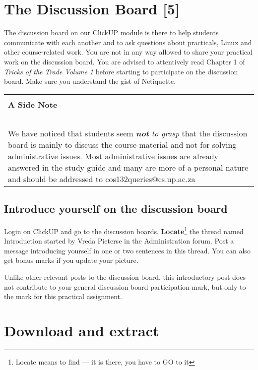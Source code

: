 \documentclass [a4paper,leqno, 12pt] {article}
\begin{document}
\section{The Discussion Board [5]}

The discussion board on our ClickUP module is there to help students communicate with each another and to ask questions about practicals, Linux and other course-related work. You are not in any way allowed to share your practical work on the discussion board. You are advised to attentively read Chapter 1 of \textit{Tricks of the Trade Volume 1} before starting to participate on the discussion board. Make sure you understand the gist of Netiquette.

\begin{center}
\begin{tabular}{|p{11cm}|}
\hline
\\
\textbf{A Side Note}
\\
~\\
We have noticed that students seem \textit{\textbf{not} to grasp} that the discussion board is mainly to discuss the course material and not for solving administrative issues. Most administrative issues are already answered in the study guide and many are more of a personal nature and should be addressed to cos132queries@cs.up.ac.za \\
\hline
\end{tabular}
\end{center}

\subsection{Introduce yourself on the discussion board}
Login on ClickUP and go to the discussion boards. \textbf{Locate}\footnote{Locate means to find --- it is there, you have to GO to it} the thread named Introduction started by Vreda Pieterse in the Administration forum. Post a message introducing yourself in one or two sentences in this thread. You can also get bonus marks if you update your picture.

Unlike other relevant posts to the discussion board, this introductory post does not contribute to your general discussion board participation mark, but only to the mark for this practical assignment.

\section{Download and extract}
\end{document}
